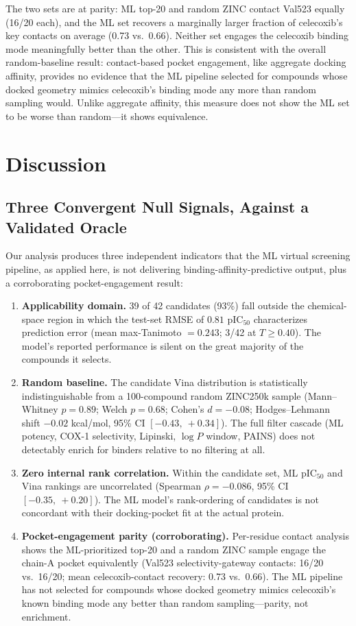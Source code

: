 \documentclass[11pt]{article}
\begin{document}
The two sets are at parity: ML top-20 and random ZINC contact Val523 equally (16/20 each), and the ML set recovers a marginally larger fraction of celecoxib's key contacts on average (0.73 vs.\ 0.66). Neither set engages the celecoxib binding mode meaningfully better than the other. This is consistent with the overall random-baseline result: contact-based pocket engagement, like aggregate docking affinity, provides no evidence that the ML pipeline selected for compounds whose docked geometry mimics celecoxib's binding mode any more than random sampling would. Unlike aggregate affinity, this measure does not show the ML set to be worse than random---it shows equivalence.

\section{Discussion}

\subsection{Three Convergent Null Signals, Against a Validated Oracle}

Our analysis produces three independent indicators that the ML virtual screening pipeline, as applied here, is not delivering binding-affinity-predictive output, plus a corroborating pocket-engagement result:

\begin{enumerate}
\item \textbf{Applicability domain.} 39 of 42 candidates (93\%) fall outside the chemical-space region in which the test-set RMSE of $0.81$ pIC$_{50}$ characterizes prediction error (mean max-Tanimoto $= 0.243$; 3/42 at $T \geq 0.40$). The model's reported performance is silent on the great majority of the compounds it selects.
\item \textbf{Random baseline.} The candidate Vina distribution is statistically indistinguishable from a 100-compound random ZINC250k sample (Mann--Whitney $p = 0.89$; Welch $p = 0.68$; Cohen's $d = -0.08$; Hodges--Lehmann shift $-0.02$ kcal/mol, 95\% CI $[-0.43,\ +0.34]$). The full filter cascade (ML potency, COX-1 selectivity, Lipinski, $\log P$ window, PAINS) does not detectably enrich for binders relative to no filtering at all.
\item \textbf{Zero internal rank correlation.} Within the candidate set, ML pIC$_{50}$ and Vina rankings are uncorrelated (Spearman $\rho = -0.086$, 95\% CI $[-0.35,\ +0.20]$). The ML model's rank-ordering of candidates is not concordant with their docking-pocket fit at the actual protein.
\item \textbf{Pocket-engagement parity (corroborating).} Per-residue contact analysis shows the ML-prioritized top-20 and a random ZINC sample engage the chain-A pocket equivalently (Val523 selectivity-gateway contacts: 16/20 vs.\ 16/20; mean celecoxib-contact recovery: 0.73 vs.\ 0.66). The ML pipeline has not selected for compounds whose docked geometry mimics celecoxib's known binding mode any better than random sampling---parity, not enrichment.
\end{enumerate}
\end{document}
